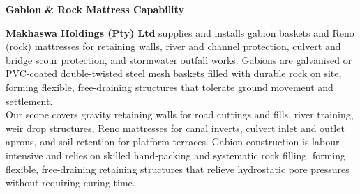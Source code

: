 \hypertarget{sec:gabions}{}

\noindent
\begin{minipage}[t]{0.62\textwidth}
    \vspace{0pt}
    {\large\bfseries\color{mhnavy} Gabion \& Rock Mattress Capability}
    \vspace{0.10cm}

    {\fontsize{8.6pt}{12.0pt}\selectfont\color{mhtext}
    \textbf{Makhaswa Holdings (Pty) Ltd} supplies and installs gabion baskets and Reno (rock) mattresses for retaining walls, river and channel protection, culvert and bridge scour protection, and stormwater outfall works. Gabions are galvanised or PVC-coated double-twisted steel mesh baskets filled with durable rock on site, forming flexible, free-draining structures that tolerate ground movement and settlement.\\[3pt]
    Our scope covers gravity retaining walls for road cuttings and fills, river training, weir drop structures, Reno mattresses for canal inverts, culvert inlet and outlet aprons, and soil retention for platform terraces. Gabion construction is labour-intensive and relies on skilled hand-packing and systematic rock filling, forming flexible, free-draining retaining structures that relieve hydrostatic pore pressures without requiring curing time.
    }
\end{minipage}
\hfill
